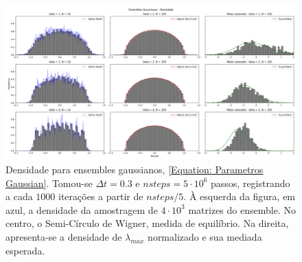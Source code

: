 \begin{figure}[ht!]
	\includegraphics[width=\textwidth]{Assets/validationGaussianTracy.png}
	\caption{Densidade para ensembles gaussianos, \ref{Equation: Parametros Gaussian}. Tomou-se $\Delta t = 0.3$ e $nsteps = 5\cdot10^6$ passos, registrando a cada $1000$ iterações a partir de $nsteps/5$. À esquerda da figura, em azul, a densidade da amostragem de $4\cdot10^3$ matrizes do ensemble. No centro, o Semi-Círculo de Wigner, medida de equilíbrio. Na direita, apresenta-se a densidade de $\lambda_{max}$ normalizado e sua mediada esperada.}
	\label{Figura: Gaussian}
\end{figure}

